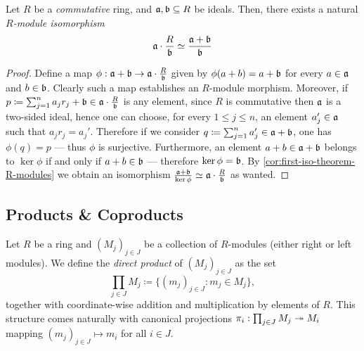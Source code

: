 \begin{proposition}
    \label{prop:a*R/b-iso-a+b/b}
    Let \(R\) be a \emph{commutative} ring, and \(\mathfrak{a}, \mathfrak{b} \subseteq R\)
    be ideals. Then, there exists a natural \emph{\(R\)-module isomorphism}
    \[
        \mathfrak{a} \cdot \frac{R}{\mathfrak{b}}
        \simeq \frac{\mathfrak{a} + \mathfrak{b}}{\mathfrak{b}}
    \]
\end{proposition}

\begin{proof}
    Define a map
    \(\phi: \mathfrak{a} + \mathfrak{b} \to \mathfrak{a} \cdot \frac{R}{\mathfrak{b}}\) given by
    \(\phi(a + b) = a + \mathfrak{b}\) for every \(a \in \mathfrak{a}\) and
    \(b \in \mathfrak{b}\). Clearly such a map establishes an \(R\)-module
    morphism. Moreover, if
    \(p \coloneq \sum_{j=1}^n a_j r_j + \mathfrak{b} \in \mathfrak{a} \cdot
    \frac{R}{\mathfrak{b}}\) is any element, since \(R\) is commutative then
    \(\mathfrak{a}\) is a two-sided ideal, hence one can choose, for every
    \(1 \leq j \leq n\), an element \(a_j' \in \mathfrak{a}\) such that
    \(a_j r_j = a_j'\). Therefore if we consider
    \(q \coloneq \sum_{j=1}^n a_j' \in \mathfrak{a} + \mathfrak{b}\), one has
    \(\phi(q) = p\) --- thus \(\phi\) is surjective. Furthermore, an element
    \(a + b \in \mathfrak{a} + \mathfrak{b}\) belongs to \(\ker \phi\) if and only if
    \(a + b \in \mathfrak{b}\) --- therefore \(\ker \phi = \mathfrak{b}\). By
    \cref{cor:first-iso-theorem-R-modules} we obtain an isomorphism
    \(\frac{\mathfrak{a} + \mathfrak{b}}{\ker \phi} \simeq \mathfrak{a} \cdot
    \frac{R}{\mathfrak{b}}\) as wanted.
\end{proof}

\subsection{Products \& Coproducts}

\begin{definition}
    \label{def:direct-product-modules}
    Let \(R\) be a ring and \((M_j)_{j \in J}\) be a collection of \(R\)-modules
    (either right or left modules). We define the \emph{direct product} of
    \((M_j)_{j \in J}\) as the set
    \[
        \prod_{j \in J} M_j \coloneq \{(m_j)_{j \in J} \colon m_j \in M_j\},
    \]
    together with coordinate-wise addition and multiplication by elements of
    \(R\). This structure comes naturally with canonical projections
    \(\pi_i: \prod_{j \in J} M_j \twoheadrightarrow M_i\) mapping \((m_j)_{j \in J} \mapsto m_i\)
    for all \(i \in J\).
\end{definition}

